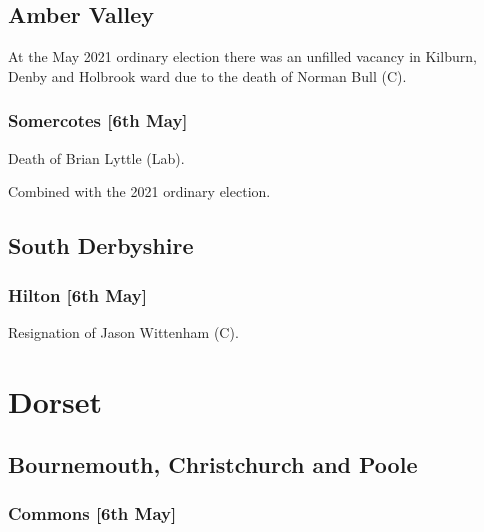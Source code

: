 \documentclass[a4paper,openany]{book}
\begin{document}
\begin{resultsiii}
\subsection*{Amber Valley}

At the May 2021 ordinary election there was an unfilled vacancy in Kilburn, Denby and Holbrook ward due to the death of Norman Bull (C).

\subsubsection*{Somercotes \hspace*{\fill}\nolinebreak[1]%
	\enspace\hspace*{\fill}
	[6th May]}


Death of Brian Lyttle (Lab).

Combined with the 2021 ordinary election.

\subsection*{South Derbyshire}

\subsubsection*{Hilton \hspace*{\fill}\nolinebreak[1]%
	\enspace\hspace*{\fill}
	[6th May]}


Resignation of Jason Wittenham (C).

\section{Dorset}

\subsection*{Bournemouth, Christchurch and Poole}

\subsubsection*{Commons \hspace*{\fill}\nolinebreak[1]%
	\enspace\hspace*{\fill}
	[6th May]}


\end{resultsiii}
\end{document}
